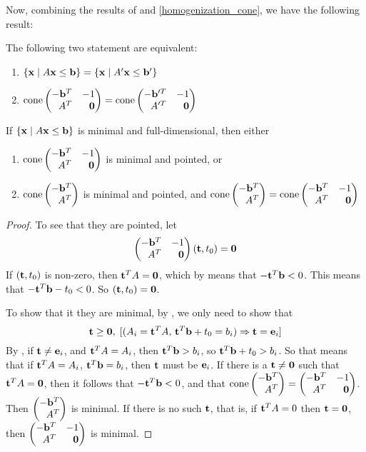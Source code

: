 Now, combining the results of  and \cref{homogenization_cone}, we have the following result:

\begin{Prop}\label{dual_homogenization_cone}
	The following two statement are equivalent:
	\begin{enumerate}
		\item $\left\{\mathbf{x}\;|\; A\mathbf{x}\leq \mathbf{b}\right\} = \left\{\mathbf{x}\;|\; A'\mathbf{x}\leq \mathbf{b}'\right\}$
		\item $\cone \pmb -\b^T & -1 \\ A^T & \0 \pme = \cone \pmb -\b'^T & -1 \\ A'^T & \0 \pme$
	\end{enumerate}
\end{Prop}

\begin{Prop}\label{dual_cone_min}
	If $\left\{\mathbf{x}\;|\; A\mathbf{x}\leq \mathbf{b}\right\}$ is minimal and full-dimensional, then either 
  \begin{enumerate}
    \item $\cone \pmb -\b^T & -1 \\ A^T & \0 \pme$ is minimal and pointed, or
    \item $\cone \pmb -\b^T \\ A^T \pme$ is minimal and pointed, and $\cone\pmb -\b^T \\ A^T \pme = \cone \pmb -\b^T & -1 \\ A^T & \0 \pme$
  \end{enumerate}
\end{Prop}

\begin{proof}
	To see that they are pointed, let
	\[\pmb -\b^T & -1 \\ A^T & \0 \pme (\t,t_0) = \0\]
	If $(\mathbf{t},t_0)$ is non-zero, then $\mathbf{t}^T A = \mathbf{0}$, which by  means that $-\mathbf{t}^T \mathbf{b} < 0$.  This means that $-\mathbf{t}^T\mathbf{b} -t_0 < 0$.  So $(\mathbf{t},t_0) = \mathbf{0}$.  
  
  To show that it they are minimal, by , we only need to show that
	\[ \mathbf{t}\geq\mathbf{0},\; [(A_i=\mathbf{t}^T A,\,\mathbf{t}^T \mathbf{b} + t_0 = b_i) \Rightarrow \mathbf{t}=\mathbf{e}_i] \]
	By , if $\mathbf{t}\neq\mathbf{e}_i$, and $\mathbf{t}^T A = A_i$, then $\mathbf{t}^T \mathbf{b} > b_i$, so $\mathbf{t}^T\mathbf{b} + t_0 > b_i$.  So that means that if $\mathbf{t}^T A = A_i$, $\mathbf{t}^T\mathbf{b} = b_i$, then $\mathbf{t}$ must be $\mathbf{e}_i$.  If there is a $\mathbf{t}\neq\mathbf{0}$ such that $\mathbf{t}^T A = \mathbf{0}$, then it follows that $-\mathbf{t}^T \mathbf{b} < 0$, and that $\cone\pmb -\b^T \\ A^T \pme = \pmb -\b^T & -1 \\ A^T & \0 \pme$.  Then $\pmb -\b^T \\ A^T \pme$ is minimal.  If there is no such $\mathbf{t}$, that is, if $\mathbf{t}^T A = 0$ then $\mathbf{t}=\mathbf{0}$, then $\pmb -\b^T & -1 \\ A^T & \0 \pme$ is minimal.
\end{proof}

